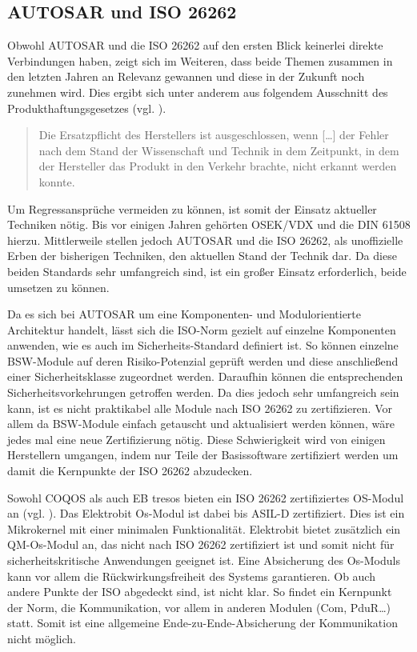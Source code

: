 \documentclass[
  a4paper,					    %
  twoside,
  DIV=calc,     				%
  bibliography=totoc,
  cleardoublepage=empty,
  ngerman,     					%
  final       					%
]{scrbook}
\begin{document}
\subsection{AUTOSAR und ISO 26262}
\label{sec:ISO26262_autosar}
Obwohl AUTOSAR und die ISO 26262 auf den ersten Blick keinerlei direkte Verbindungen haben, zeigt sich im Weiteren, dass beide Themen zusammen in den letzten Jahren an Relevanz gewannen und diese in der Zukunft noch zunehmen wird. Dies ergibt sich unter anderem aus folgendem Ausschnitt des Produkthaftungsgesetzes (vgl. \cite{ProdG}).

\begin{quote}
Die Ersatzpflicht des Herstellers ist ausgeschlossen, wenn [\dots] der Fehler nach dem Stand der Wissenschaft und Technik in dem Zeitpunkt, in dem der Hersteller das Produkt in den Verkehr brachte, nicht erkannt werden konnte.
\end{quote}

Um Regressansprüche vermeiden zu können, ist somit der Einsatz aktueller Techniken nötig. Bis vor einigen Jahren gehörten OSEK/VDX und die DIN 61508 hierzu. Mittlerweile stellen jedoch AUTOSAR und die ISO 26262, als unoffizielle Erben der bisherigen Techniken, den aktuellen Stand der Technik dar. Da diese beiden Standards sehr umfangreich sind, ist ein großer Einsatz erforderlich, beide umsetzen zu können.

Da es sich bei AUTOSAR um eine Komponenten- und Modulorientierte Architektur handelt, lässt sich die ISO-Norm gezielt auf einzelne Komponenten anwenden, wie es auch im Sicherheits-Standard definiert ist. So können einzelne BSW-Module auf deren Risiko-Potenzial geprüft werden und diese anschließend einer Sicherheitsklasse zugeordnet werden. Daraufhin können die entsprechenden Sicherheitsvorkehrungen getroffen werden. Da dies jedoch sehr umfangreich sein kann, ist es nicht praktikabel alle Module nach ISO 26262 zu zertifizieren. Vor allem da BSW-Module einfach getauscht und aktualisiert werden können, wäre jedes mal eine neue Zertifizierung nötig. Diese Schwierigkeit wird von einigen Herstellern umgangen, indem nur Teile der Basissoftware zertifiziert werden um damit die Kernpunkte der ISO 26262 abzudecken.

Sowohl COQOS als auch EB tresos bieten ein ISO 26262 zertifiziertes OS-Modul an (vgl. \cite{eb_tresos}\cite{coqos}). Das Elektrobit Os-Modul ist dabei bis ASIL-D zertifiziert. Dies ist ein Mikrokernel mit einer minimalen Funktionalität. Elektrobit bietet zusätzlich ein QM-Os-Modul an, das nicht nach ISO 26262 zertifiziert ist und somit nicht für sicherheitskritische Anwendungen geeignet ist. Eine Absicherung des Os-Moduls kann vor allem die Rückwirkungsfreiheit des Systems garantieren. Ob auch andere Punkte der ISO abgedeckt sind, ist nicht klar. So findet ein Kernpunkt der Norm, die Kommunikation, vor allem in anderen Modulen (Com, PduR\dots) statt. Somit ist eine allgemeine Ende-zu-Ende-Absicherung der Kommunikation nicht möglich.
\end{document}
